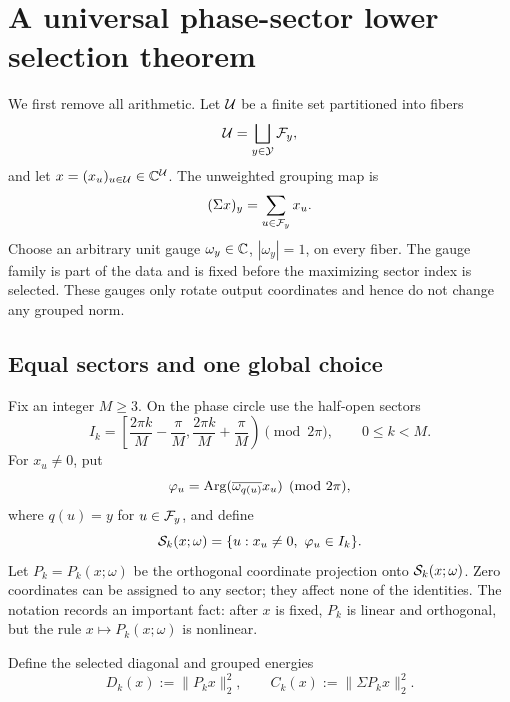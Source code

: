 \section{A universal phase-sector lower selection theorem}
\label{sec:sector-theorem}

We first remove all arithmetic.  Let \(\mathcal U\) be a finite set partitioned
into fibers
\begin{equation}
 \mathcal U=\bigsqcup_{y\in\mathcal Y}\mathcal F_y,
 \label{eq:tpc56-abstract-fibers}
\end{equation}
and let \(x=(x_u)_{u\in\mathcal U}\in\mathbb C^{\mathcal U}\).  The unweighted grouping map is
\begin{equation}
 (\Sigma x)_y=\sum_{u\in\mathcal F_y}x_u.
 \label{eq:tpc56-abstract-grouping}
\end{equation}
Choose an arbitrary unit gauge \(\omega_y\in\mathbb C\),
\(|\omega_y|=1\), on every fiber.  The gauge family is part of the data and
is fixed before the maximizing sector index is selected.  These gauges only
rotate output coordinates and hence do not change any grouped norm.

\subsection{Equal sectors and one global choice}

Fix an integer \(M\ge3\).  On the phase circle use the half-open sectors
\begin{equation}
 I_k=
 \left[\frac{2\pi k}{M}-\frac\pi M,
       \frac{2\pi k}{M}+\frac\pi M\right)
 \pmod {2\pi},
 \qquad 0\le k<M.
 \label{eq:tpc56-equal-sectors}
\end{equation}
For \(x_u\ne0\), put
\begin{equation}
 \varphi_u=\operatorname{Arg}(\overline{\omega_{q(u)}}x_u)\pmod {2\pi},
 \label{eq:tpc56-normalized-phase}
\end{equation}
where \(q(u)=y\) for \(u\in\mathcal F_y\), and define
\begin{equation}
 \mathcal S_k(x;\omega)=\{u:x_u\ne0,\ \varphi_u\in I_k\}.
 \label{eq:tpc56-sector-support}
\end{equation}
Let \(P_k=P_k(x;\omega)\) be the orthogonal coordinate projection onto
\(\mathcal S_k(x;\omega)\).  Zero coordinates can be assigned to any sector;
they affect none of the identities.  The notation records an important
fact: after \(x\) is fixed, \(P_k\) is linear and orthogonal, but the rule
\(x\mapsto P_k(x;\omega)\) is nonlinear.

Define the selected diagonal and grouped energies
\begin{equation}
 D_k(x):=\|P_kx\|_2^2,
 \qquad
 C_k(x):=\|\Sigma P_kx\|_2^2.
 \label{eq:tpc56-sector-energies}
\end{equation}

